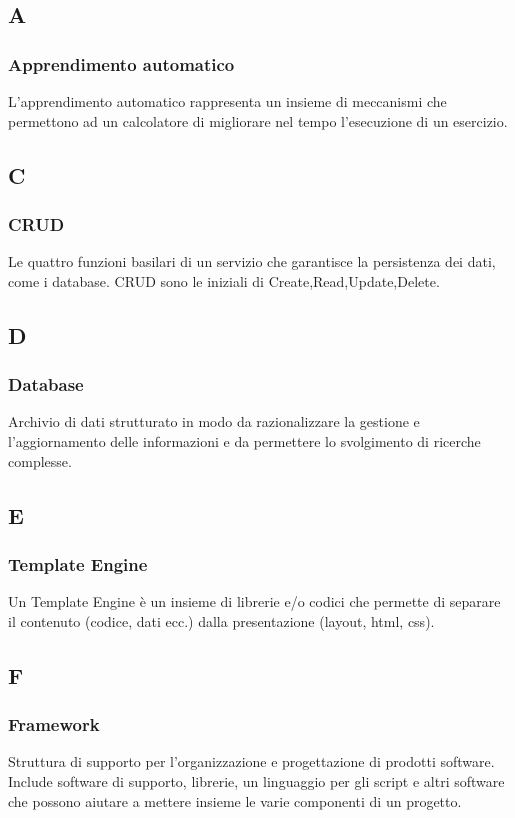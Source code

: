 \subsection{A}
	\subsubsection{Apprendimento automatico}
	L'apprendimento automatico rappresenta un insieme di meccanismi che permettono ad un calcolatore
	di migliorare nel tempo l'esecuzione di un esercizio.
	
	\subsection{C}
	\subsubsection{CRUD}
	Le quattro funzioni basilari di un servizio che garantisce la persistenza dei dati, come i database.
	CRUD sono le iniziali di Create,Read,Update,Delete.
	
	\subsection{D}
	\subsubsection{Database}
	Archivio di dati strutturato in modo da razionalizzare la gestione e l'aggiornamento delle informazioni e da permettere lo svolgimento di ricerche complesse.
	
	\subsection{E}
	\subsubsection{Template Engine}
	Un Template Engine è un insieme di librerie e/o codici che permette di separare il contenuto (codice, dati ecc.) dalla presentazione (layout, html, css).
	
	\subsection{F}
	\subsubsection{Framework}
	Struttura di supporto per l'organizzazione e progettazione di prodotti software. Include software di supporto, librerie, un linguaggio per gli script e altri software che possono aiutare a mettere insieme le varie componenti di un progetto.
	
